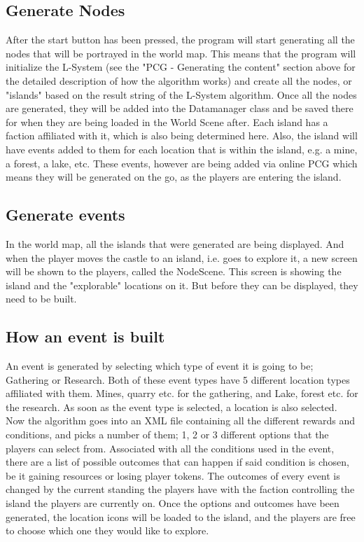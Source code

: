 \subsection{Generate Nodes}
After the start button has been pressed, the program will start generating all the nodes that will be portrayed in the world map. This means that the program will initialize the L-System (see the "PCG - Generating the content" section above for the detailed description of how the algorithm works) and create all the nodes, or "islands" based on the result string of the L-System algorithm. Once all the nodes are generated, they will be added into the Datamanager class and be saved there for when they are being loaded in the World Scene after. 
Each island has a faction affiliated with it, which is also being determined here. Also, the island will have events added to them for each location that is within the island, e.g. a mine, a forest, a lake, etc. These events, however are being added via online PCG which means they will be generated on the go, as the players are entering the island.

\subsection{Generate events}
In the world map, all the islands that were generated are being displayed. And when the player moves the castle to an island, i.e. goes to explore it, a new screen will be shown to the players, called the NodeScene. This screen is showing the island and the "explorable" locations on it. But before they can be displayed, they need to be built. 

\subsection{How an event is built}
An event is generated by selecting which type of event it is going to be; Gathering or Research. Both of these event types have 5 different location types affiliated with them. Mines, quarry etc. for the gathering, and Lake, forest etc. for the research. As soon as the event type is selected, a location is also selected. Now the algorithm goes into an XML file containing all the different rewards and conditions, and picks a number of them; 1, 2 or 3 different options that the players can select from. Associated with all the conditions used in the event, there are a list of possible outcomes that can happen if said condition is chosen, be it gaining resources or losing player tokens. The outcomes of every event is changed by the current standing the players have with the faction controlling the island the players are currently on. 
Once the options and outcomes have been generated, the location icons will be loaded to the island, and the players are free to choose which one they would like to explore.

